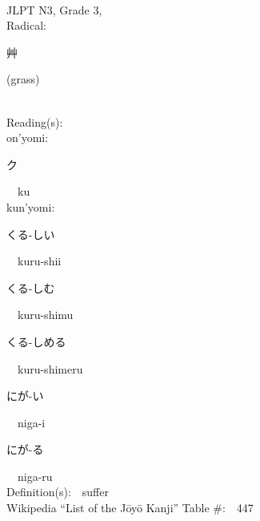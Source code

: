 \begin{multicols}{2}
{\fontsize{34pt}{40pt}  }\ \ \\  %
{JLPT N3, Grade 3, \\Radical:\ \ {\begin{CJK}{UTF8}{min} 艸 \end{CJK}} (grass) } \\
Reading(s):\ \ \\
{\hspace*{1em}}on'yomi:\ \ \\
{\hspace*{2em}}{\begin{CJK}{UTF8}{min} ク \end{CJK}}\ \ ku\ \ \\
{\hspace*{1em}}kun'yomi:\ \ \\
{\hspace*{2em}}{\begin{CJK}{UTF8}{min} くる-しい \end{CJK}}\ \ kuru-shii\ \ \\
{\hspace*{2em}}{\begin{CJK}{UTF8}{min} くる-しむ \end{CJK}}\ \ kuru-shimu\ \ \\
{\hspace*{2em}}{\begin{CJK}{UTF8}{min} くる-しめる \end{CJK}}\ \ kuru-shimeru\ \ \\
{\hspace*{2em}}{\begin{CJK}{UTF8}{min} にが-い \end{CJK}}\ \ niga-i\ \ \\
{\hspace*{2em}}{\begin{CJK}{UTF8}{min} にが-る \end{CJK}}\ \ niga-ru\ \ \\
Definition(s):\ \ suffer \\
Wikipedia ``List of the J\=oy\=o Kanji'' Table \#:\ \ 447 \\
\ \ \\
{\fontsize{34pt}{40pt}  }\ \ \\  %

\end{multicols}
